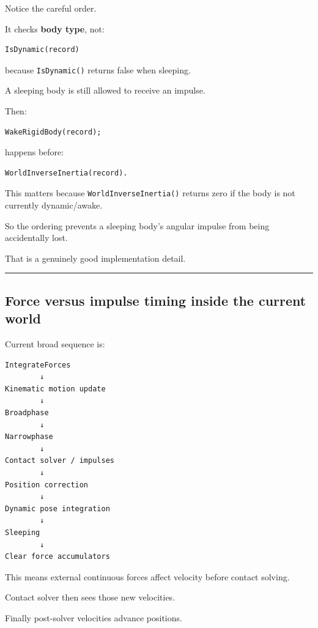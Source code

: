 Notice the careful order.

It checks \textbf{body type}, not:

\begin{verbatim}
IsDynamic(record)
\end{verbatim}

because \texttt{IsDynamic()} returns false when sleeping.

A sleeping body is still allowed to receive an impulse.

Then:

\begin{verbatim}
WakeRigidBody(record);
\end{verbatim}

happens before:

\begin{verbatim}
WorldInverseInertia(record).
\end{verbatim}

This matters because \texttt{WorldInverseInertia()} returns zero if the body is not currently dynamic/awake.

So the ordering prevents a sleeping body's angular impulse from being accidentally lost.

That is a genuinely good implementation detail.

\begin{center}\rule{0.5\linewidth}{0.5pt}\end{center}

\subsection{Force versus impulse timing inside the current world}\label{06-engine-ii-ch037-force-versus-impulse-timing-inside-the-current-world}

Current broad sequence is:

\begin{verbatim}
IntegrateForces
        ↓
Kinematic motion update
        ↓
Broadphase
        ↓
Narrowphase
        ↓
Contact solver / impulses
        ↓
Position correction
        ↓
Dynamic pose integration
        ↓
Sleeping
        ↓
Clear force accumulators
\end{verbatim}

This means external continuous forces affect velocity before contact solving.

Contact solver then sees those new velocities.

Finally post-solver velocities advance positions.

